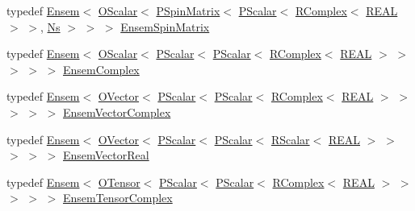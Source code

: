 \begin{DoxyCompactItemize}
\item 
typedef \mbox{\hyperlink{classENSEM_1_1Ensem}{Ensem}}$<$ \mbox{\hyperlink{classENSEM_1_1OScalar}{O\+Scalar}}$<$ \mbox{\hyperlink{classENSEM_1_1PSpinMatrix}{P\+Spin\+Matrix}}$<$ \mbox{\hyperlink{classENSEM_1_1PScalar}{P\+Scalar}}$<$ \mbox{\hyperlink{classENSEM_1_1RComplex}{R\+Complex}}$<$ \mbox{\hyperlink{namespaceENSEM_a6dd9aa6508168f545c861787e63ddd1e}{R\+E\+AL}} $>$ $>$, \mbox{\hyperlink{namespaceENSEM_a6f05e048f9b2eb1a19131074f8abc25f}{Ns}} $>$ $>$ $>$ \mbox{\hyperlink{group__defs_gafa28f0d9727eaa39fea6e3089c22ba33}{Ensem\+Spin\+Matrix}}
\item 
typedef \mbox{\hyperlink{classENSEM_1_1Ensem}{Ensem}}$<$ \mbox{\hyperlink{classENSEM_1_1OScalar}{O\+Scalar}}$<$ \mbox{\hyperlink{classENSEM_1_1PScalar}{P\+Scalar}}$<$ \mbox{\hyperlink{classENSEM_1_1PScalar}{P\+Scalar}}$<$ \mbox{\hyperlink{classENSEM_1_1RComplex}{R\+Complex}}$<$ \mbox{\hyperlink{namespaceENSEM_a6dd9aa6508168f545c861787e63ddd1e}{R\+E\+AL}} $>$ $>$ $>$ $>$ $>$ \mbox{\hyperlink{group__defs_ga5d1497403fdbca6ecdeec3d05de9a223}{Ensem\+Complex}}
\item 
typedef \mbox{\hyperlink{classENSEM_1_1Ensem}{Ensem}}$<$ \mbox{\hyperlink{classENSEM_1_1OVector}{O\+Vector}}$<$ \mbox{\hyperlink{classENSEM_1_1PScalar}{P\+Scalar}}$<$ \mbox{\hyperlink{classENSEM_1_1PScalar}{P\+Scalar}}$<$ \mbox{\hyperlink{classENSEM_1_1RComplex}{R\+Complex}}$<$ \mbox{\hyperlink{namespaceENSEM_a6dd9aa6508168f545c861787e63ddd1e}{R\+E\+AL}} $>$ $>$ $>$ $>$ $>$ \mbox{\hyperlink{group__defs_ga13b984332760feb8bc9c8f1071ade9ef}{Ensem\+Vector\+Complex}}
\item 
typedef \mbox{\hyperlink{classENSEM_1_1Ensem}{Ensem}}$<$ \mbox{\hyperlink{classENSEM_1_1OVector}{O\+Vector}}$<$ \mbox{\hyperlink{classENSEM_1_1PScalar}{P\+Scalar}}$<$ \mbox{\hyperlink{classENSEM_1_1PScalar}{P\+Scalar}}$<$ \mbox{\hyperlink{classENSEM_1_1RScalar}{R\+Scalar}}$<$ \mbox{\hyperlink{namespaceENSEM_a6dd9aa6508168f545c861787e63ddd1e}{R\+E\+AL}} $>$ $>$ $>$ $>$ $>$ \mbox{\hyperlink{group__defs_gaa5c6b9de066b629db579dd1b6a585299}{Ensem\+Vector\+Real}}
\item 
typedef \mbox{\hyperlink{classENSEM_1_1Ensem}{Ensem}}$<$ \mbox{\hyperlink{classENSEM_1_1OTensor}{O\+Tensor}}$<$ \mbox{\hyperlink{classENSEM_1_1PScalar}{P\+Scalar}}$<$ \mbox{\hyperlink{classENSEM_1_1PScalar}{P\+Scalar}}$<$ \mbox{\hyperlink{classENSEM_1_1RComplex}{R\+Complex}}$<$ \mbox{\hyperlink{namespaceENSEM_a6dd9aa6508168f545c861787e63ddd1e}{R\+E\+AL}} $>$ $>$ $>$ $>$ $>$ \mbox{\hyperlink{group__defs_ga3d22b4deb8e2322433882b290ff83364}{Ensem\+Tensor\+Complex}}

\end{DoxyCompactItemize}
